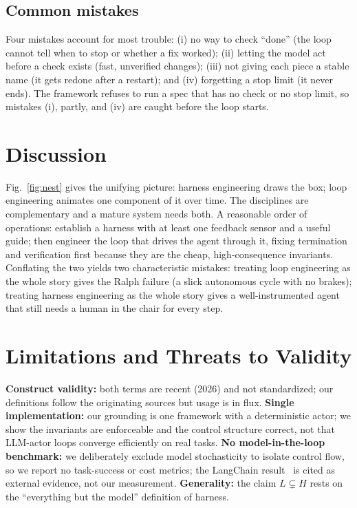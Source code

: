 \documentclass[10pt,twocolumn,letterpaper]{article}
\begin{document}
\subsection{Common mistakes}
Four mistakes account for most trouble: (i) no way to check ``done'' (the loop
cannot tell when to stop or whether a fix worked); (ii) letting the model act
before a check exists (fast, unverified changes); (iii) not giving each piece a
stable name (it gets redone after a restart); and (iv) forgetting a stop limit
(it never ends). The framework refuses to run a spec that has no check or no
stop limit, so mistakes (i), partly, and (iv) are caught before the loop starts.

\section{Discussion}
Fig.~\ref{fig:nest} gives the unifying picture: harness engineering draws the
box; loop engineering animates one component of it over time. The disciplines
are complementary and a mature system needs both. A reasonable order of
operations: establish a harness with at least one feedback sensor and a useful
guide; then engineer the loop that drives the agent through it, fixing
termination and verification first because they are the cheap, high-consequence
invariants. Conflating the two yields two characteristic mistakes: treating loop
engineering as the whole story gives the Ralph failure (a slick autonomous cycle
with no brakes); treating harness engineering as the whole story gives a
well-instrumented agent that still needs a human in the chair for every step.

\section{Limitations and Threats to Validity}
\textbf{Construct validity:} both terms are recent (2026) and not standardized;
our definitions follow the originating sources but usage is in flux.
\textbf{Single implementation:} our grounding is one framework with a
deterministic actor; we show the invariants are enforceable and the control
structure correct, not that LLM-actor loops converge efficiently on real tasks.
\textbf{No model-in-the-loop benchmark:} we deliberately exclude model
stochasticity to isolate control flow, so we report no task-success or cost
metrics; the LangChain result~\cite{langchain} is cited as external evidence,
not our measurement. \textbf{Generality:} the claim $L \subsetneq H$ rests on
the ``everything but the model'' definition of harness.
\end{document}
